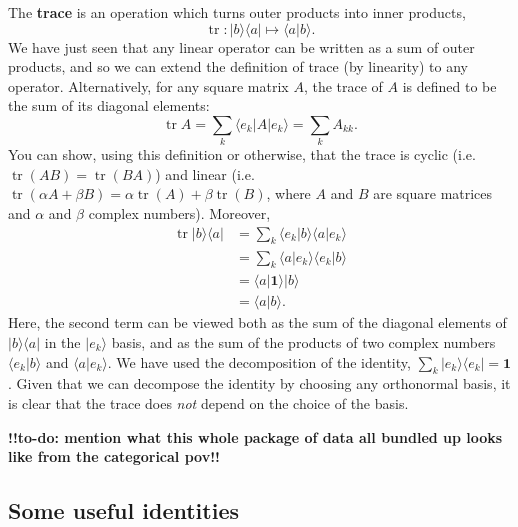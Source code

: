 \documentclass[fleqn]{article}
\begin{document}
The \textbf{trace} is an operation which turns outer products into inner products,
\[
  \operatorname{tr}\colon |b\rangle\langle a| \longmapsto \langle a|b\rangle.
\]
We have just seen that any linear operator can be written as a sum of outer products, and so we can extend the definition of trace (by linearity) to any operator.
Alternatively, for any square matrix \(A\), the trace of \(A\) is defined to be the sum of its diagonal elements:
\[
  \operatorname{tr}A = \sum_k \langle e_k|A|e_k\rangle = \sum_k A_{kk}.
\]
You can show, using this definition or otherwise, that the trace is cyclic (i.e.~\(\operatorname{tr}(AB) = \operatorname{tr}(BA)\)) and linear (i.e.~\(\operatorname{tr}(\alpha A+\beta B) = \alpha\operatorname{tr}(A)+\beta\operatorname{tr}(B)\), where \(A\) and \(B\) are square matrices and \(\alpha\) and \(\beta\) complex numbers).
Moreover,
\[
  \begin{aligned}
    \operatorname{tr}|b\rangle\langle a|
    &= \sum_k \langle e_k|b\rangle\langle a|e_k\rangle
  \\&= \sum_k \langle a|e_k\rangle\langle e_k|b\rangle
  \\&= \langle a|\mathbf{1}\rangle|b\rangle
  \\&= \langle a|b\rangle.
  \end{aligned}
\]
Here, the second term can be viewed both as the sum of the diagonal elements of \(|b\rangle\langle a|\) in the \(|e_k\rangle\) basis, and as the sum of the products of two complex numbers \(\langle e_k|b\rangle\) and \(\langle a|e_k\rangle\).
We have used the decomposition of the identity, \(\sum_k|e_k\rangle\langle e_k|=\mathbf{1}\).
Given that we can decompose the identity by choosing any orthonormal basis, it is clear that the trace does \emph{not} depend on the choice of the basis.

\textbf{!!to-do: mention what this whole package of data all bundled up looks like from the categorical pov!!}

\hypertarget{some-useful-identities}{%
\subsection{Some useful identities}\label{some-useful-identities}}
\end{document}
